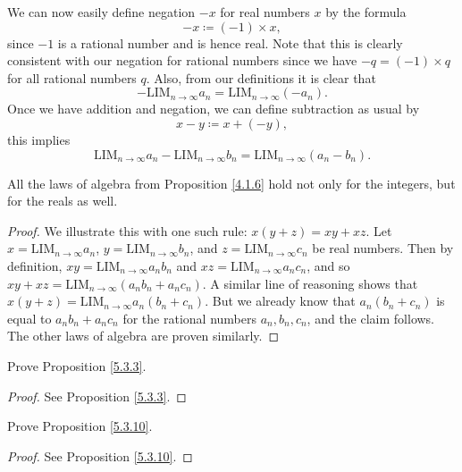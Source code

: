 \begin{note}
We can now easily define negation \(-x\) for real numbers \(x\) by the formula
\[
    -x \coloneqq (-1) \times x,
\]
since \(-1\) is a rational number and is hence real.
Note that this is clearly consistent with our negation for rational numbers since we have \(-q = (-1) \times q\) for all rational numbers \(q\).
Also, from our definitions it is clear that
\[
    -\text{LIM}_{n \to \infty} a_n = \text{LIM}_{n \to \infty} (-a_n).
\]
Once we have addition and negation, we can define subtraction as usual by
\[
    x - y \coloneqq x + (-y),
\]
this implies
\[
    \text{LIM}_{n \to \infty} a_n - \text{LIM}_{n \to \infty} b_n = \text{LIM}_{n \to \infty} (a_n - b_n).
\]
\end{note}

\begin{proposition}\label{5.3.11}
All the laws of algebra from Proposition \ref{4.1.6} hold not only for the integers, but for the reals as well.
\end{proposition}

\begin{proof}
We illustrate this with one such rule: \(x(y + z) = xy + xz\).
Let \(x = \text{LIM}_{n \to \infty} a_n\), \(y = \text{LIM}_{n \to \infty} b_n\), and \(z = \text{LIM}_{n \to \infty} c_n\) be real numbers.
Then by definition, \(xy = \text{LIM}_{n \to \infty} a_n b_n\) and \(xz = \text{LIM}_{n \to \infty} a_n c_n\), and so \(xy + xz = \text{LIM}_{n \to \infty} (a_n b_n + a_n c_n)\).
A similar line of reasoning shows that \(x(y + z) = \text{LIM}_{n \to \infty} a_n (b_n + c_n)\).
But we already know that \(a_n (b_n + c_n)\) is equal to \(a_n b_n + a_n c_n\) for the rational numbers \(a_n, b_n, c_n\), and the claim follows.
The other laws of algebra are proven similarly.
\end{proof}

\exercisesection

\begin{exercise}\label{ex 5.3.1}
Prove Proposition \ref{5.3.3}.
\end{exercise}

\begin{proof}
See Proposition \ref{5.3.3}.
\end{proof}

\begin{exercise}\label{ex 5.3.2}
Prove Proposition \ref{5.3.10}.
\end{exercise}

\begin{proof}
See Proposition \ref{5.3.10}.
\end{proof}